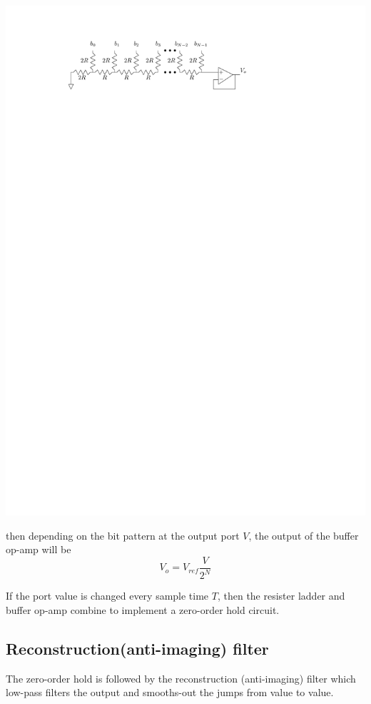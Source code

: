 \begin{center}
  \includegraphics[scale=1]{graphics/resistor-ladder.pdf}
\end{center}


then depending on the bit pattern at the output port $V$, the output of the buffer op-amp will be
\[
V_o = V_{ref}\frac{V}{2^N}
\]

If the port value is changed every sample time $T$, then the resister ladder and buffer op-amp combine to implement a zero-order hold circuit.

\subsection{Reconstruction(anti-imaging) filter}

The zero-order hold is followed by the reconstruction (anti-imaging) filter which low-pass filters the output and smooths-out the jumps from value to value.

